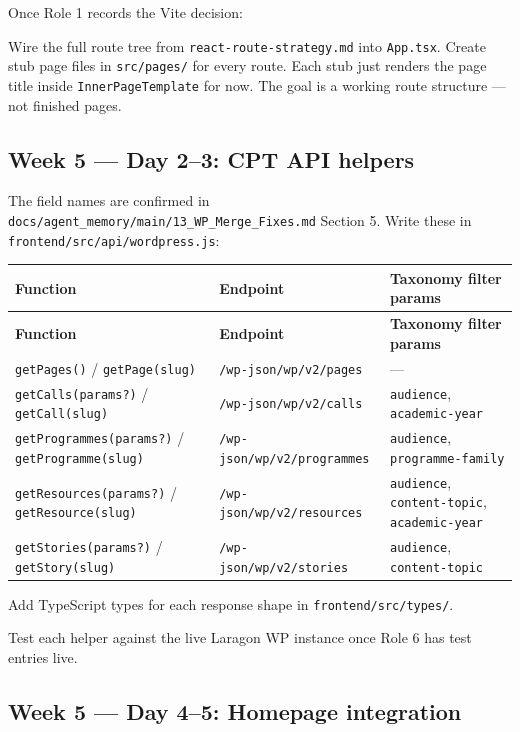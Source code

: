 \documentclass[11pt,a4paper]{article}
\begin{document}
Once Role 1 records the Vite decision:

Wire the full route tree from \nolinkurl{react-route-strategy.md} into \nolinkurl{App.tsx}. Create stub page files in \nolinkurl{src/pages/} for every route. Each stub just renders the page title inside \nolinkurl{InnerPageTemplate} for now. The goal is a working route structure — not finished pages.

\subsection{Week 5 — Day 2–3: CPT API helpers}

The field names are confirmed in \nolinkurl{docs/agent_memory/main/13_WP_Merge_Fixes.md} Section 5. Write these in \nolinkurl{frontend/src/api/wordpress.js}:

\begin{longtable}{@{}p{3.4cm}p{6.6cm}p{4.2cm}@{}}
\rowcolor{uvtLightBlue}
\textbf{Function} & \textbf{Endpoint} & \textbf{Taxonomy filter params} \\
\midrule
\endfirsthead
\rowcolor{uvtLightBlue}
\textbf{Function} & \textbf{Endpoint} & \textbf{Taxonomy filter params} \\
\midrule
\endhead
\nolinkurl{getPages()} / \nolinkurl{getPage(slug)} & \nolinkurl{/wp-json/wp/v2/pages} & — \\
\nolinkurl{getCalls(params?)} / \nolinkurl{getCall(slug)} & \nolinkurl{/wp-json/wp/v2/calls} & \nolinkurl{audience}, \nolinkurl{academic-year} \\
\nolinkurl{getProgrammes(params?)} / \nolinkurl{getProgramme(slug)} & \nolinkurl{/wp-json/wp/v2/programmes} & \nolinkurl{audience}, \nolinkurl{programme-family} \\
\nolinkurl{getResources(params?)} / \nolinkurl{getResource(slug)} & \nolinkurl{/wp-json/wp/v2/resources} & \nolinkurl{audience}, \nolinkurl{content-topic}, \nolinkurl{academic-year} \\
\nolinkurl{getStories(params?)} / \nolinkurl{getStory(slug)} & \nolinkurl{/wp-json/wp/v2/stories} & \nolinkurl{audience}, \nolinkurl{content-topic} \\
\end{longtable}

Add TypeScript types for each response shape in \nolinkurl{frontend/src/types/}.

Test each helper against the live Laragon WP instance once Role 6 has test entries live.

\subsection{Week 5 — Day 4–5: Homepage integration}
\end{document}
